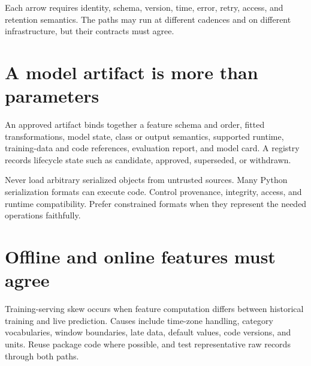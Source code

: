 \begin{center}
\end{center}

Each arrow requires identity, schema, version, time, error, retry, access, and
retention semantics. The paths may run at different cadences and on different
infrastructure, but their contracts must agree.

\section{A model artifact is more than parameters}

An approved artifact binds together a feature schema and order, fitted
transformations, model state, class or output semantics, supported runtime,
training-data and code references, evaluation report, and model card. A registry
records lifecycle state such as candidate, approved, superseded, or withdrawn.

Never load arbitrary serialized objects from untrusted sources. Many Python
serialization formats can execute code. Control provenance, integrity, access,
and runtime compatibility. Prefer constrained formats when they represent the
needed operations faithfully.

\section{Offline and online features must agree}

Training-serving skew occurs when feature computation differs between historical
training and live prediction. Causes include time-zone handling, category
vocabularies, window boundaries, late data, default values, code versions, and
units. Reuse package code where possible, and test representative raw records
through both paths.

